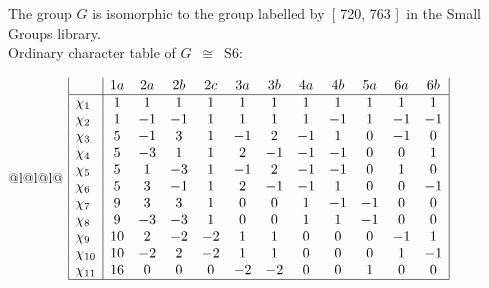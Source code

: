 \documentclass[varwidth=\maxdimen,border=10]{standalone}
\begin{document}
The group $G$ is isomorphic to the group labelled by\ [ 720, 763 ]\ in the Small Groups library.\\
Ordinary character table of $G$\ $\cong$\ S6:\\
\begin{center}
\begin{tabular}{@{}l@{}l@{}l@{}}
\hline
\(\begin{array}{|l|ccccccccccc|}
  & 1a & 2a & 2b & 2c & 3a & 3b & 4a & 4b & 5a & 6a & 6b\\ \hline
\chi_{1} & 1 & 1 & 1 & 1 & 1 & 1 & 1 & 1 & 1 & 1 & 1\\
\chi_{2} & 1 & -1 & -1 & 1 & 1 & 1 & 1 & -1 & 1 & -1 & -1\\
\chi_{3} & 5 & -1 & 3 & 1 & -1 & 2 & -1 & 1 & 0 & -1 & 0\\
\chi_{4} & 5 & -3 & 1 & 1 & 2 & -1 & -1 & -1 & 0 & 0 & 1\\
\chi_{5} & 5 & 1 & -3 & 1 & -1 & 2 & -1 & -1 & 0 & 1 & 0\\
\chi_{6} & 5 & 3 & -1 & 1 & 2 & -1 & -1 & 1 & 0 & 0 & -1\\
\chi_{7} & 9 & 3 & 3 & 1 & 0 & 0 & 1 & -1 & -1 & 0 & 0\\
\chi_{8} & 9 & -3 & -3 & 1 & 0 & 0 & 1 & 1 & -1 & 0 & 0\\
\chi_{9} & 10 & 2 & -2 & -2 & 1 & 1 & 0 & 0 & 0 & -1 & 1\\
\chi_{10} & 10 & -2 & 2 & -2 & 1 & 1 & 0 & 0 & 0 & 1 & -1\\
\chi_{11} & 16 & 0 & 0 & 0 & -2 & -2 & 0 & 0 & 1 & 0 & 0\\
\hline
\end{array}\)\\
\end{tabular}
\end{center}
\end{document}
